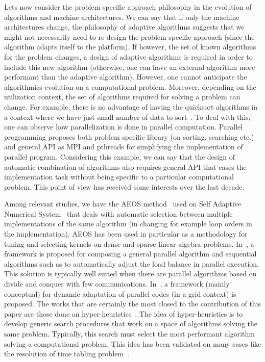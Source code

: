 Lets now consider the problem specific approach philosophy in the evolution of algorithms and machine 
architectures. We can say that if only the machine architectures change, the philosophy of adaptive 
algorithms suggests that we might not necessarily need to re-design the problem specific approach (since 
the algorithm adapts itself to the platform). 
If however, the set of known algorithms for the problem changes, a design of adaptive algorithms 
is required in order to include this new algorithm (otherwise, one can have an external algorithm more performant 
than the adaptive algorithm). However, one cannot anticipate the algorithmics evolution on a computational problem. 
Moreover, depending on the utilization context, the set of algorithms required for solving a problem can change. 
For example, there is no advantage of having the quicksort algorithms in a context where we have just 
small number of data to sort~\cite{Knuth}. To deal with this, one can observe how parallelization is 
done in  parallel computation. Parallel programming proposes both problem specific library (on sorting, searching etc.) 
and general API as MPI and pthreads for simplifying the implementation of parallel program. 
Considering this example, we can say that the design of automatic combination 
of algorithms also  requires general API that eases the implementation task without being specific to a particular 
computational problem. This point of view has received some interests over the last decade. 

Among relevant studies, we have the AEOS 
method~\cite{AEOS} used on Self Adaptive Numerical System~\cite{SANSComponent} that deals with automatic 
selection between multiple implementations of the same algorithm (in changing for example loop orders in the 
implementation). 
AEOS has been used in particular as a methodology for tuning and selecting kernels on dense and sparse linear 
algebra problems. In~\cite{Daouda}, a framework is proposed for composing a general parallel algorithm and  
sequential algorithms such as to automatically adjust the load balance in parallel execution. 
This solution is typically well suited when there are parallel algorithms based on divide and conquer with few 
communications. In~\cite{Pazat}, a framework (mainly conceptual) for dynamic adaptation of parallel codes (in a grid context) 
is proposed. The works that are certainly the most closed to the contribution of this paper are those done 
on hyper-heuristics~\cite{HyperHeuristics}. The idea of hyper-heuristics is to develop generic search 
procedures that work on a space of algorithms solving the same problem. Typically, this search must select the most performant algorithm solving a computational problem. This idea has been validated 
on many cases like the resolution of time tabling problem~\cite{AdaptiveHH}.

